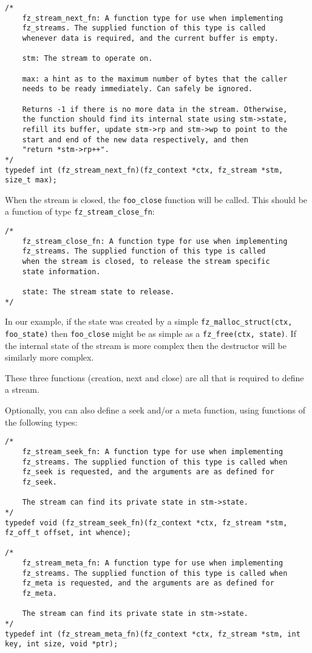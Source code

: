 \documentclass[oneside]{book}
\begin{document}
\begin{lstlisting}
/*
	fz_stream_next_fn: A function type for use when implementing
	fz_streams. The supplied function of this type is called
	whenever data is required, and the current buffer is empty.

	stm: The stream to operate on.

	max: a hint as to the maximum number of bytes that the caller
	needs to be ready immediately. Can safely be ignored.

	Returns -1 if there is no more data in the stream. Otherwise,
	the function should find its internal state using stm->state,
	refill its buffer, update stm->rp and stm->wp to point to the
	start and end of the new data respectively, and then
	"return *stm->rp++".
*/
typedef int (fz_stream_next_fn)(fz_context *ctx, fz_stream *stm, size_t max);
\end{lstlisting}

When the stream is closed, the \texttt{foo\_close} function will be called. This should be a function of type \texttt{fz\_stream\_close\_fn}:

\begin{lstlisting}
/*
	fz_stream_close_fn: A function type for use when implementing
	fz_streams. The supplied function of this type is called
	when the stream is closed, to release the stream specific
	state information.

	state: The stream state to release.
*/
\end{lstlisting}

In our example, if the state was created by a simple \texttt{fz\_malloc\_struct(ctx, foo\_state)} then \texttt{foo\_close} might be as simple as a \texttt{fz\_free(ctx, state)}. If the internal state of the stream is more complex then the destructor will be similarly more complex.

These three functions (creation, next and close) are all that is required to define a stream.

Optionally, you can also define a seek and/or a meta function, using functions of the following types:

\begin{lstlisting}
/*
	fz_stream_seek_fn: A function type for use when implementing
	fz_streams. The supplied function of this type is called when
	fz_seek is requested, and the arguments are as defined for
	fz_seek.

	The stream can find its private state in stm->state.
*/
typedef void (fz_stream_seek_fn)(fz_context *ctx, fz_stream *stm, fz_off_t offset, int whence);

/*
	fz_stream_meta_fn: A function type for use when implementing
	fz_streams. The supplied function of this type is called when
	fz_meta is requested, and the arguments are as defined for
	fz_meta.

	The stream can find its private state in stm->state.
*/
typedef int (fz_stream_meta_fn)(fz_context *ctx, fz_stream *stm, int key, int size, void *ptr);
\end{lstlisting}
\end{document}
